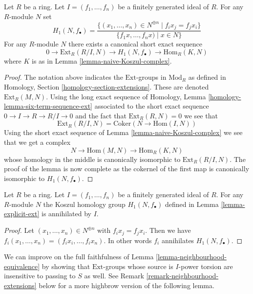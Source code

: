\begin{lemma}
\label{lemma-explicit-ext}
Let $R$ be a ring. Let $I = (f_1, \ldots, f_n)$ be a finitely generated ideal
of $R$. For any $R$-module $N$ set
$$
H_1(N, f_\bullet) =
\frac{\{(x_1, \ldots, x_n) \in N^{\oplus n} \mid f_i x_j = f_j x_i \}}
{\{f_1x, \ldots, f_nx) \mid x \in N\}}
$$
For any $R$-module $N$ there exists a canonical short exact sequence
$$
0 \to \text{Ext}_R(R/I, N) \to H_1(N, f_\bullet) \to \text{Hom}_R(K, N)
$$
where $K$ is as in
Lemma \ref{lemma-naive-Koszul-complex}.
\end{lemma}

\begin{proof}
The notation above indicates the $\text{Ext}$-groups in $\text{Mod}_R$
as defined in
Homology, Section \ref{homology-section-extensions}.
These are denoted $\text{Ext}_R(M, N)$. Using the long exact sequence of
Homology, Lemma \ref{homology-lemma-six-term-sequence-ext}
associated to the short exact sequence $0 \to I \to R \to R/I \to 0$
and the fact that $\text{Ext}_R(R, N) = 0$ we see that
$$
\text{Ext}_R(R/I, N) =
\text{Coker}(N \longrightarrow \text{Hom}(I, N))
$$
Using the short exact sequence of
Lemma \ref{lemma-naive-Koszul-complex}
we see that we get a complex
$$
N \to \text{Hom}(M, N) \to \text{Hom}_R(K, N)
$$
whose homology in the middle is canonically isomorphic to
$\text{Ext}_R(R/I, N)$. The proof of the lemma is now complete
as the cokernel of the first map
is canonically isomorphic to $H_1(N, f_\bullet)$.
\end{proof}

\begin{lemma}
\label{lemma-koszul-homology-annihilated}
Let $R$ be a ring. Let $I = (f_1, \ldots, f_n)$ be a finitely generated ideal
of $R$. For any $R$-module $N$ the Koszul homology group
$H_1(N, f_\bullet)$ defined in
Lemma \ref{lemma-explicit-ext}
is annihilated by $I$.
\end{lemma}

\begin{proof}
Let $(x_1, \ldots, x_n) \in N^{\oplus n}$ with $f_i x_j = f_j x_i$.
Then we have $f_i(x_1, \ldots, x_n) = (f_i x_i, \ldots, f_i x_n)$.
In other words $f_i$ annihilates $H_1(N, f_\bullet)$.
\end{proof}

\noindent
We can improve on the full faithfulness of
Lemma \ref{lemma-neighbourhood-equivalence}
by showing that $\text{Ext}$-groups whose source is $I$-power torsion
are insensitive to passing to $S$ as well. See
Remark \ref{remark-neighbourhood-extensions}
below for a more highbrow version of the following lemma.

